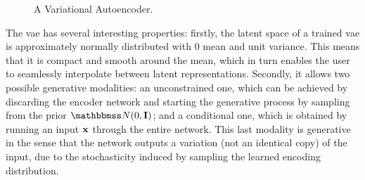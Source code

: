\begin{figure*}[h!]
    \centering
    \resizebox{.75\textwidth}{!}{}
    \caption{A Variational Autoencoder.}
    \label{fig:vae}
\end{figure*}
The \gls{vae} has several interesting properties: firstly, the latent space of a trained \gls{vae} is approximately normally distributed with 0 mean and unit variance. This means that it is compact and smooth around the mean, which in turn enables the user to seamlessly interpolate between latent representations. Secondly, it allows two possible generative modalities: an unconstrained one, which can be achieved by discarding the encoder network and starting the generative process by sampling from the prior $\Normal{0}{\Matrix{I}}$; and a conditional one, which is obtained by running an input $\Vector{x}$ through the entire network. This last modality is generative in the sense that the network outputs a variation (not an identical copy) of the input, due to the stochasticity induced by sampling the learned encoding distribution.